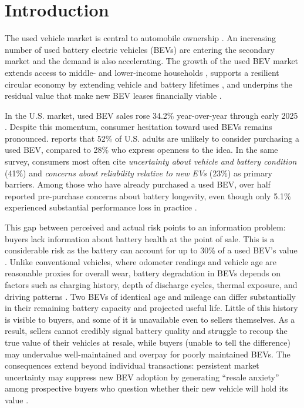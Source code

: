 \documentclass[a4paper,fleqn]{cas-sc}   %
\begin{document}
\section{Introduction}
\label{section:intro}
The used vehicle market is central to automobile ownership \parencite{marketresearchfutureUnitedStatesUsed2025}. An increasing number of used battery electric vehicles (BEVs) are entering the secondary market and the demand is also accelerating. The growth of the used BEV market extends access to middle- and lower-income households \parencite{hagmanTotalCostOwnership2016}, supports a resilient circular economy by extending vehicle and battery lifetimes \parencite{guzekElectricVehiclesOverview2024}, and underpins the residual value that make new BEV leases financially viable \parencite{bruckmannResaleAnxietyObstacle2021, limMassAdoptionElectric2015}.

In the U.S. market, used BEV sales rose 34.2\% year-over-year through early 2025 \parencite{coxautomotiveinc.EVMarketMonitor2025}. Despite this momentum, consumer hesitation toward used BEVs remains pronounced. \textcite{fernandesUSUnderstandingConsumer2023} reports that 52\% of U.S. adults are unlikely to consider purchasing a used BEV, compared to 28\% who express openness to the idea. In the same survey, consumers most often cite \textit{uncertainty about vehicle and battery condition} (41\%) and \textit{concerns about reliability relative to new EVs} (23\%) as primary barriers. Among those who have already purchased a used BEV, over half reported pre-purchase concerns about battery longevity, even though only 5.1\% experienced substantial performance loss in practice \parencite{sheykhfardAnalyzingPurchaseIntentions2025}. 

This gap between perceived and actual risk points to an information problem: buyers lack information about battery health at the point of sale. This is a considerable risk as the battery can account for up to 30\% of a used BEV's value \parencite{boudwayBatteriesElectricCars2020}. Unlike conventional vehicles, where odometer readings and vehicle age are reasonable proxies for overall wear, battery degradation in BEVs depends on factors such as charging history, depth of discharge cycles, thermal exposure, and driving patterns \parencite{bashashPluginHybridElectric2011, neubauerSensitivityBatteryElectric2012}. Two BEVs of identical age and mileage can differ substantially in their remaining battery capacity and projected useful life. Little of this history is visible to buyers, and some of it is unavailable even to sellers themselves. As a result, sellers cannot credibly signal battery quality and struggle to recoup the true value of their vehicles at resale, while buyers (unable to tell the difference) may undervalue well-maintained and  overpay for poorly maintained BEVs. The consequences extend beyond individual transactions: persistent market uncertainty may suppress new BEV adoption by generating ``resale anxiety'' among prospective buyers who question whether their new vehicle will hold its value \parencite{bruckmannResaleAnxietyObstacle2021}. 
\end{document}
